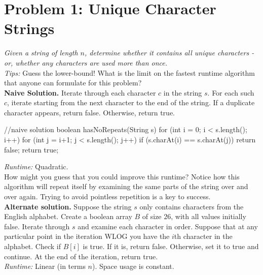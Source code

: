 

\section*{Problem 1: Unique Character Strings} 

\textit{Given a string of length $n$, determine whether it contains all unique characters - or, whether any characters are used more than once.}\\

\textit{Tips:} Guess the lower-bound! What is the limit on the fastest runtime algorithm that anyone can formulate for this problem?\\

\textbf{Naive Solution.} Iterate through each character $c$ in the string $s$. For each such $c$, iterate starting from the next character to the end of the string. If a duplicate character appears, return false. Otherwise, return true.\\

\begin{java}
    //naive solution
    boolean hasNoRepeats(String s) {
        for (int i = 0; i < s.length(); i++) {
            for (int j = i+1; j < s.length(); j++) {
                if (s.charAt(i) == s.charAt(j)) {
                    return false;
                }
            }
        }
        return true;
    }
\end{java}

\textit{Runtime:} Quadratic.\\

How might you guess that you could improve this runtime? Notice how this algorithm will repeat itself by examining the same parts of the string over and over again. Trying to avoid pointless repetition is a key to success.\\

\textbf{Alternate solution.} Suppose the string $s$ only contains characters from the English alphabet. Create a boolean array $B$ of size $26$, with all values initially false. Iterate through $s$ and examine each character in order. Suppose that at any particular point in the iteration WLOG you have the $i$th character in the alphabet. Check if $B[i]$ is true. If it is, return false. Otherwise, set it to true and continue. At the end of the iteration, return true.\\

\textit{Runtime:} Linear (in terms $n$). Space usage is constant.\\

